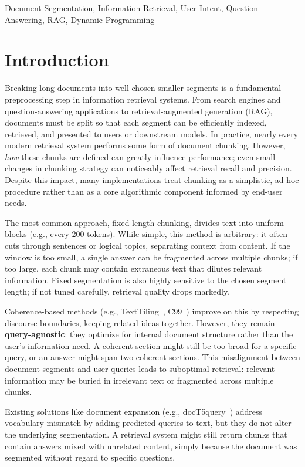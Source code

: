 \documentclass[conference]{IEEEtran}
\begin{document}
\begin{IEEEkeywords}
Document Segmentation, Information Retrieval, User Intent, Question Answering, RAG, Dynamic Programming
\end{IEEEkeywords}

\section{Introduction}

Breaking long documents into well-chosen smaller segments is a fundamental preprocessing step in information retrieval systems. From search engines and question-answering applications to retrieval-augmented generation (RAG), documents must be split so that each segment can be efficiently indexed, retrieved, and presented to users or downstream models. In practice, nearly every modern retrieval system performs some form of document chunking. However, \textit{how} these chunks are defined can greatly influence performance; even small changes in chunking strategy can noticeably affect retrieval recall and precision. Despite this impact, many implementations treat chunking as a simplistic, ad-hoc procedure rather than as a core algorithmic component informed by end-user needs.

The most common approach, fixed-length chunking, divides text into uniform blocks (e.g., every 200 tokens). While simple, this method is arbitrary: it often cuts through sentences or logical topics, separating context from content. If the window is too small, a single answer can be fragmented across multiple chunks; if too large, each chunk may contain extraneous text that dilutes relevant information. Fixed segmentation is also highly sensitive to the chosen segment length; if not tuned carefully, retrieval quality drops markedly.

Coherence-based methods (e.g., TextTiling~\cite{hearst1997texttiling}, C99~\cite{choi2000advances}) improve on this by respecting discourse boundaries, keeping related ideas together. However, they remain \textbf{query-agnostic}: they optimize for internal document structure rather than the user's information need. A coherent section might still be too broad for a specific query, or an answer might span two coherent sections. This misalignment between document segments and user queries leads to suboptimal retrieval: relevant information may be buried in irrelevant text or fragmented across multiple chunks.

Existing solutions like document expansion (e.g., docT5query~\cite{nogueira2019doctttttquery}) address vocabulary mismatch by adding predicted queries to text, but they do not alter the underlying segmentation. A retrieval system might still return chunks that contain answers mixed with unrelated content, simply because the document was segmented without regard to specific questions.
\end{document}
